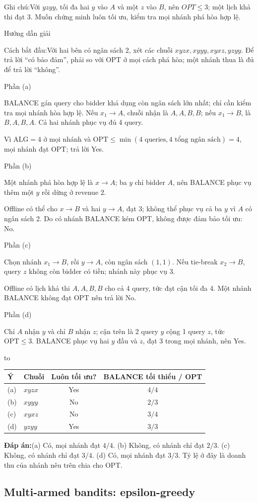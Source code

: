 \documentclass[10pt,a4paper,twocolumn]{article}
\makeatletter
\newcommand{\maptag}[1]{\phantomsection\@bsphack\protected@write\@auxout{}{\string\newlabel{#1}{{}{\thepage}{}{\@currentHref}{}}}\@esphack}
\newif\ifexamheadingprinted
\newcommand{\topic}[2]{%
  \global\examheadingprintedfalse\par\subsection{#2}\label{topic:#1}}
\newcommand{\key}[1]{#1:\enspace}
\newcommand{\solutionprompt}[1]{\par\addvspace{1pt}\noindent\key{Cách bắt đầu}#1\par\addvspace{2pt}}
\newcommand{\examnote}[1]{\par\addvspace{2pt}\noindent\key{Ghi chú}#1\par\addvspace{3pt}}
\newcommand{\blocklabel}[1]{\par\noindent#1\par\nobreak}
\newcommand{\answer}[1]{%
  \par\addvspace{3pt}%
  \blocklabel{#1Hướng dẫn giải}}
\newcommand{\finalanswer}[1]{%
  \par\addvspace{3pt}\noindent\textbf{Đáp án:}\nobreak\enspace#1\par}
\newcommand{\guidepart}[1]{%
  \par\addvspace{1.5pt}%
  \blocklabel{Phần #1}}
\newenvironment{examtable}[1]{%
  \par\addvspace{2pt}\noindent\hbox to \linewidth\bgroup\hfil
  \setlength{\tabcolsep}{4pt}%
  \renewcommand{\arraystretch}{1.12}\begin{tabular}{#1}%
}{\end{tabular}\hfil\egroup\par\addvspace{2pt}}
\makeatother
\begin{document}
\examnote{Với $yzyy$, tối đa hai $y$ vào $A$ và một $z$ vào $B$, nên $OPT\le3$; một lịch khả thi đạt 3. Muốn chứng minh luôn tối ưu, kiểm tra mọi nhánh phá hòa hợp lệ.}
\answer{\maptag{answer:A2-Q5}\maptag{answer:P24-Q8}}
\solutionprompt{Với hai bên có ngân sách 2, xét các chuỗi $xyzx,xyyy,xyxz,yzyy$. Để trả lời “có bảo đảm”, phải so với OPT ở mọi cách phá hòa; một nhánh thua là đủ để trả lời “không”.}
\guidepart{(a)}
\begin{guidesteps}
\item BALANCE gán query cho bidder khả dụng còn ngân sách lớn nhất; chỉ cần kiểm tra mọi nhánh hòa hợp lệ. Nếu $x_1\to A$, chuỗi nhận là $A,A,B,B$; nếu $x_1\to B$, là $B,A,B,A$. Cả hai nhánh phục vụ đủ 4 query.
\item Vì $\mathrm{ALG}=4$ ở mọi nhánh và $\mathrm{OPT}\le\min(4\text{ queries},4\text{ tổng ngân sách})=4$, mọi nhánh đạt OPT; trả lời Yes.
\end{guidesteps}
\guidepart{(b)}
\begin{guidesteps}
\item Một nhánh phá hòa hợp lệ là $x\to A$; ba $y$ chỉ bidder $A$, nên BALANCE phục vụ thêm một $y$ rồi dừng ở revenue 2.
\item Offline có thể cho $x\to B$ và hai $y\to A$, đạt 3; không thể phục vụ cả ba $y$ vì $A$ có ngân sách 2. Do có nhánh BALANCE kém OPT, không được đảm bảo tối ưu: No.
\end{guidesteps}
\guidepart{(c)}
\begin{guidesteps}
\item Chọn nhánh $x_1\to B$, rồi $y\to A$, còn ngân sách $(1,1)$. Nếu tie-break $x_2\to B$, query $z$ không còn bidder có tiền; nhánh này phục vụ 3.
\item Offline có lịch khả thi $A,A,B,B$ cho cả 4 query, tức đạt cận tối đa 4. Một nhánh BALANCE không đạt OPT nên trả lời No.
\end{guidesteps}
\guidepart{(d)}
\begin{guidesteps}
\item Chỉ $A$ nhận $y$ và chỉ $B$ nhận $z$; cận trên là 2 query $y$ cộng 1 query $z$, tức $\mathrm{OPT}\le3$. BALANCE phục vụ hai $y$ đầu và $z$, đạt 3 trong mọi nhánh, nên Yes.
\begin{examtable}{@{}l l c c@{}}
\toprule
Ý & Chuỗi & Luôn tối ưu? & BALANCE tối thiểu / OPT \\
\midrule
(a) & $xyzx$ & Yes & $4/4$ \\
(b) & $xyyy$ & No & $2/3$ \\
(c) & $xyxz$ & No & $3/4$ \\
(d) & $yzyy$ & Yes & $3/3$ \\
\bottomrule
\end{examtable}
\end{guidesteps}
\finalanswer{(a) Có, mọi nhánh đạt $4/4$. (b) Không, có nhánh chỉ đạt $2/3$. (c) Không, có nhánh chỉ đạt $3/4$. (d) Có, mọi nhánh đạt $3/3$. Tỷ lệ ở đây là doanh thu của nhánh nêu trên chia cho OPT.}
\topic{bandits}{Multi-armed bandits: epsilon-greedy}
\end{document}

